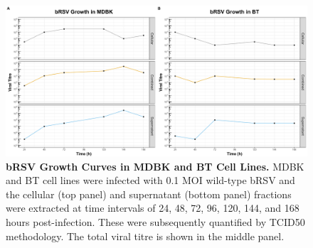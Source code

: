 \begin{figure}
    \centering
    \includegraphics[width=1\linewidth]{07. Chapter 2/Figs/01. Technologies/01. growth_curves.pdf}
    \caption[bRSV Growth Curves in MDBK and BT Cell Lines.]{\textbf{bRSV Growth Curves in MDBK and BT Cell Lines.} MDBK and BT cell lines were infected with 0.1 MOI wild-type bRSV and the cellular (top panel) and supernatant (bottom panel) fractions were extracted at time intervals of 24, 48, 72, 96, 120, 144, and 168 hours post-infection. These were subsequently quantified by TCID50 methodology. The total viral titre is shown in the middle panel.}
    \label{fig:bRSV growth curves in MDBK and BT cell lines}
\end{figure}



